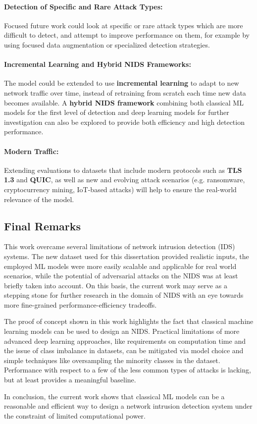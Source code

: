 \paragraph{Detection of Specific and Rare Attack Types: } Focused future work could look at specific or rare attack types which are more difficult to detect, and attempt to improve performance on them, for example by using focused data augmentation or specialized detection strategies.

\paragraph{Incremental Learning and Hybrid NIDS Frameworks: } The model could be extended to use \textbf{incremental learning} to adapt to new network traffic over time, instead of retraining from scratch each time new data becomes available. A \textbf{hybrid NIDS framework} combining both classical ML models for the first level of detection and deep learning models for further investigation can also be explored to provide both efficiency and high detection performance.

\paragraph{Modern Traffic: } Extending evaluations to datasets that include modern protocols such as \textbf{TLS 1.3} and \textbf{QUIC}, as well as new and evolving attack scenarios (e.g. ransomware, cryptocurrency mining, IoT-based attacks) will help to ensure the real-world relevance of the model.



\subsection{Final Remarks} 
This work overcame several  limitations of network intrusion detection (IDS) systems. The new dataset used for this dissertation provided realistic inputs, the employed ML models were more easily scalable and applicable for real world scenarios, while the potential of adversarial attacks on the NIDS was at least briefly taken into account. On this basis, the current work may serve as a stepping stone for further research in the domain of NIDS with an eye towards more fine-grained performance-efficiency tradeoffs.

The proof of concept shown in this work highlights the fact that classical machine learning models can be used to design an NIDS. Practical limitations of more advanced deep learning approaches, like requirements on computation time and the issue of class imbalance in datasets, can be mitigated via model choice and simple techniques like oversampling the minority classes in the dataset. Performance with respect to a few of the less common types of attacks is lacking, but at least provides a meaningful baseline.

In conclusion, the current work shows that classical ML models can be a reasonable and efficient way to design a network intrusion detection system under the constraint of limited computational power.
